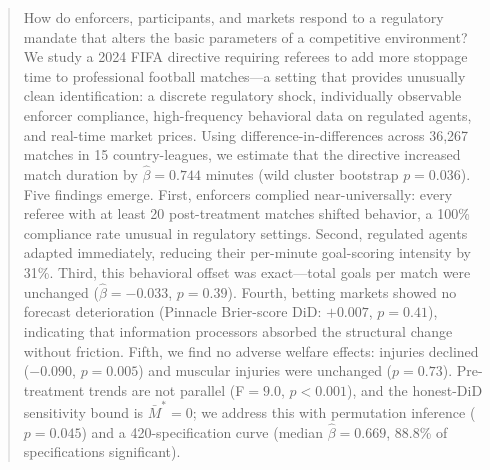 
\begin{abstract}

How do enforcers, participants, and markets respond to a regulatory mandate
that alters the basic parameters of a competitive environment?
We study a 2024 FIFA directive requiring referees to add more stoppage time
to professional football matches---a setting that provides unusually clean
identification: a discrete regulatory shock, individually observable
enforcer compliance, high-frequency behavioral data on regulated agents,
and real-time market prices.
Using difference-in-differences across 36{,}267 matches in 15 country-leagues,
we estimate that the directive increased match duration by
$\hat{\beta}=0.744$ minutes (wild cluster bootstrap $p=0.036$).
Five findings emerge.
First, enforcers complied near-universally: every referee with at least
20 post-treatment matches shifted behavior, a 100\% compliance rate
unusual in regulatory settings.
Second, regulated agents adapted immediately, reducing their per-minute
goal-scoring intensity by 31\%.
Third, this behavioral offset was exact---total goals per match were
unchanged ($\hat{\beta}=-0.033$, $p=0.39$).
Fourth, betting markets showed no forecast deterioration
(Pinnacle Brier-score DiD: $+0.007$, $p=0.41$), indicating that
information processors absorbed the structural change without friction.
Fifth, we find no adverse welfare effects: injuries declined
($-0.090$, $p=0.005$) and muscular injuries were unchanged ($p=0.73$).
Pre-treatment trends are not parallel (F$=9.0$, $p<0.001$), and the
\citet{RambachanRoth2023} honest-DiD sensitivity bound is
$\bar{M}^{*}=0$; we address this with permutation inference ($p=0.045$)
and a 420-specification curve (median $\hat{\beta}=0.669$, 88.8\%
of specifications significant).

\end{abstract}


